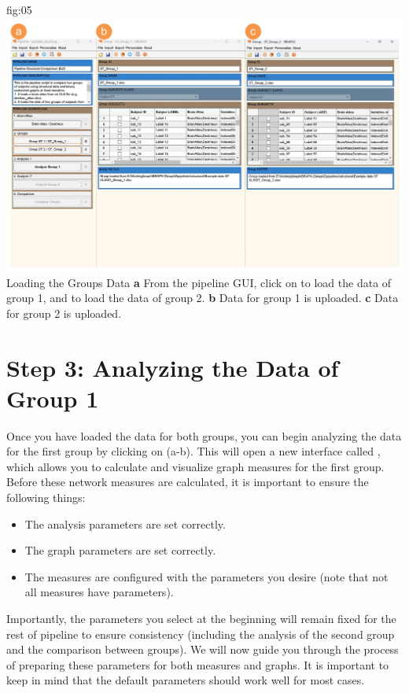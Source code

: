 \documentclass[justified]{tufte-handout}
\begin{document}
	{fig:05}
	{\includegraphics{fig05.jpg}}
	{Loading the Groups Data}
	{
	{\bf a} From the pipeline GUI, click on  to load the data of group 1, and  to load the data of group 2.
	{\bf b} Data for group 1 is uploaded. {\bf c} Data for group 2 is uploaded.
	}


\section{Step 3: Analyzing the Data of Group 1}

Once you have loaded the data for both groups, you can begin analyzing the data for the first group by clicking on  (a-b). 
This will open a new interface called , which allows you to calculate and visualize graph measures for the first group. 
Before these network measures are calculated, it is important to ensure the following things: 
\begin{itemize}

\item The analysis parameters are set correctly.

\item The graph parameters are set correctly.

\item The measures are configured with the parameters you desire (note that not all measures have parameters).

\end{itemize}

Importantly, the parameters you select at the beginning will remain fixed for the rest of pipeline to ensure consistency (including the analysis of the second group and the comparison between groups). We will now guide you through the process of preparing these parameters for both measures and graphs. It is important to keep in mind that the default parameters should work well for most cases.
\end{document}
